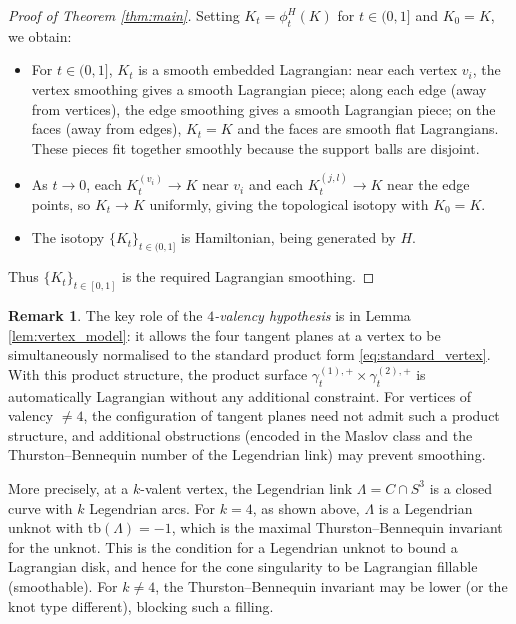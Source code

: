 \documentclass[12pt]{article}
\theoremstyle{definition}
\newtheorem{remark}[theorem]{Remark}
\begin{document}
\begin{proof}[Proof of Theorem \ref{thm:main}]
Setting $K_t = \phi_t^H(K)$ for $t\in(0,1]$ and $K_0 = K$, we obtain:
\begin{itemize}
  \item For $t\in(0,1]$, $K_t$ is a smooth embedded Lagrangian: near each vertex $v_i$, the vertex smoothing gives a smooth Lagrangian piece; along each edge (away from vertices), the edge smoothing gives a smooth Lagrangian piece; on the faces (away from edges), $K_t = K$ and the faces are smooth flat Lagrangians. These pieces fit together smoothly because the support balls are disjoint.
  \item As $t\to 0$, each $K_t^{(v_i)} \to K$ near $v_i$ and each $K_t^{(j,l)} \to K$ near the edge points, so $K_t \to K$ uniformly, giving the topological isotopy with $K_0 = K$.
  \item The isotopy $\{K_t\}_{t\in(0,1]}$ is Hamiltonian, being generated by $H$.
\end{itemize}
Thus $\{K_t\}_{t\in[0,1]}$ is the required Lagrangian smoothing.
\end{proof}

\begin{remark}
The key role of the \emph{$4$-valency hypothesis} is in Lemma \ref{lem:vertex_model}: it allows the four tangent planes at a vertex to be simultaneously normalised to the standard product form \eqref{eq:standard_vertex}. With this product structure, the product surface $\gamma_t^{(1),+}\times\gamma_t^{(2),+}$ is automatically Lagrangian without any additional constraint. For vertices of valency $\neq 4$, the configuration of tangent planes need not admit such a product structure, and additional obstructions (encoded in the Maslov class and the Thurston--Bennequin number of the Legendrian link) may prevent smoothing.

More precisely, at a $k$-valent vertex, the Legendrian link $\Lambda = C\cap S^3$ is a closed curve with $k$ Legendrian arcs. For $k=4$, as shown above, $\Lambda$ is a Legendrian unknot with $\text{tb}(\Lambda)=-1$, which is the maximal Thurston--Bennequin invariant for the unknot. This is the condition for a Legendrian unknot to bound a Lagrangian disk, and hence for the cone singularity to be Lagrangian fillable (smoothable). For $k\neq 4$, the Thurston--Bennequin invariant may be lower (or the knot type different), blocking such a filling.
\end{remark}
\end{document}
